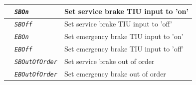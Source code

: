 \documentclass{template/openetcs}
\begin{document}
\begin{itemize}
\begin{longtable}{|l|l|l|}
			\hline
			
			&	\begin{minipage}[t]{0.40\linewidth} \emph{\texttt{SBOn}} \end{minipage}
			&	\begin{minipage}[t]{0.38\linewidth} Set service brake TIU input to ’on’ \end{minipage} \\
			
			\hline
			
			&	\begin{minipage}[t]{0.40\linewidth} \emph{\texttt{SBOff}} \end{minipage}
			&	\begin{minipage}[t]{0.38\linewidth} Set service brake TIU input to ’off’ \end{minipage} \\
			
			\hline
			
			&	\begin{minipage}[t]{0.40\linewidth} \emph{\texttt{EBOn}} \end{minipage}
			&	\begin{minipage}[t]{0.38\linewidth} Set emergency brake TIU input to ’on’ \end{minipage} \\
			
			\hline
			
			&	\begin{minipage}[t]{0.40\linewidth} \emph{\texttt{EBOff}} \end{minipage}
			&	\begin{minipage}[t]{0.38\linewidth} Set emergency brake TIU input to ’off’ \end{minipage} \\
			
			\hline
			
			&	\begin{minipage}[t]{0.40\linewidth} \emph{\texttt{SBOutOfOrder}} \end{minipage}
			&	\begin{minipage}[t]{0.38\linewidth} Set service brake out of order \end{minipage} \\
			
			\hline
			
			&	\begin{minipage}[t]{0.40\linewidth} \emph{\texttt{EBOutOfOrder}} \end{minipage}
			&	\begin{minipage}[t]{0.38\linewidth} Set emergency brake out of order \end{minipage} \\
			

\end{longtable}
\end{itemize}
\end{document}
